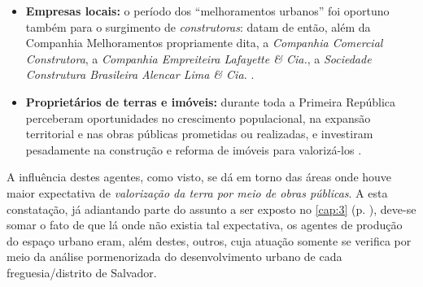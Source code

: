 \begin{itemize}
\item \textbf{Empresas locais:} o período dos ``melhoramentos urbanos'' foi oportuno também para o surgimento de \textit{construtoras}: datam de então, além da Companhia Melhoramentos propriamente dita, a \textit{Companhia Comercial Construtora}, a \textit{Companhia Empreiteira Lafayette \& Cia.}, a \textit{Sociedade Construtura Brasileira Alencar Lima \& Cia.} \cite{flexor_higi_2011}.
\item \textbf{Proprietários de terras e imóveis:} durante toda a Primeira República perceberam oportunidades no crescimento populacional, na expansão territorial e nas obras públicas prometidas ou realizadas, e investiram pesadamente na construção e reforma de imóveis para valorizá-los \cite{almeida_victoria_1997,almeida_vitrinescomercio_2014}.
\end{itemize}

A influência destes agentes, como visto, se dá em torno das áreas onde houve maior expectativa de \textit{valorização da terra por meio de obras públicas}. A esta constatação, já adiantando parte do assunto a ser exposto no \autoref{cap:3} (p. \pageref{cap:3}), deve-se somar o fato de que lá onde não existia tal expectativa, os agentes de produção do espaço urbano eram, além destes, outros, cuja atuação somente se verifica por meio da análise pormenorizada do desenvolvimento urbano de cada freguesia/distrito de Salvador.
